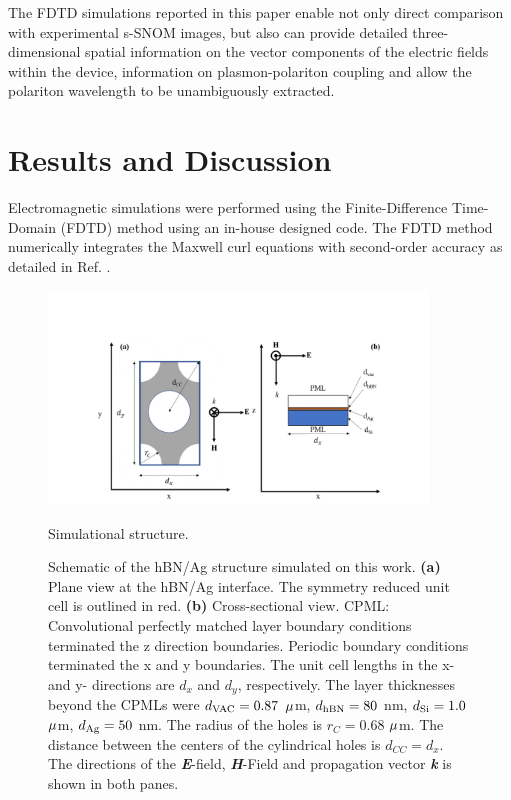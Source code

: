 \documentclass[
reprint,
amsmath,amssymb,
aip,
jap,
floatfix,
]{revtex4-2}
\begin{document}
    The FDTD simulations reported in this paper enable not only direct comparison with experimental s-SNOM images, but also can provide detailed three-dimensional spatial information on the vector components of the electric fields within the device, information on plasmon-polariton coupling and allow the polariton wavelength to be unambiguously extracted.

  \section{Results and Discussion}
  \label{sec:RnD}
    Electromagnetic simulations were performed using the Finite-Difference Time-Domain (FDTD) method    \cite{Kane:66} using an in-house designed code. The FDTD method numerically integrates the Maxwell curl equations with second-order accuracy as detailed in Ref. \cite{Taflove:05}.

      \begin{figure}[h]
        \centering\includegraphics[width=0.9\textwidth]{FiguresCh4/StructurehBNAgHex.png}
        \caption{Simulational structure.}
        \caption*{Schematic of the hBN/Ag structure simulated on this work. \textbf{(a)} Plane view at the hBN/Ag interface. The symmetry reduced unit cell is outlined in red. \textbf{(b)} Cross-sectional view. CPML: Convolutional perfectly matched layer boundary conditions terminated the z direction boundaries. Periodic boundary conditions terminated the x and y boundaries. The unit cell lengths in the x- and y- directions are $d_{x} $ and $d_{y}$, respectively. The layer thicknesses beyond the CPMLs were $d_{\rm{VAC}} = 0.87$ $\rm \mu$m, $d_{\rm{hBN}} = 80$ nm, $d_{\rm{Si}} = 1.0$ $\rm \mu$m, $d_{\rm{Ag}} = 50$ nm. The radius of the holes is $r_{C} = 0.68$ $\rm \mu$m. The distance between the centers of the cylindrical holes is $d_{CC} = d_{x} $. The directions of the \textbf{\textit{E}}-field, \textbf{\textit{H}}-Field and propagation vector \textbf{\textit{k}} is shown in both panes.}
        \label{fig:1}
      \end{figure}
\end{document}
